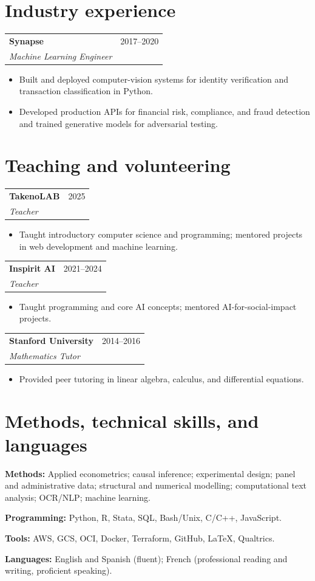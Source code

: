\documentclass[10pt,letterpaper]{article}
\makeatletter
\newcommand{\cvrole}[4]{%
  \begin{tabularx}{\textwidth}{@{}>{\raggedright\arraybackslash}X>{\raggedleft\arraybackslash}p{1.5in}@{}}
    \textbf{\color{ink}#1} & \small{#2} \\
    \textit{#3} & \hfill\makebox[0pt][r]{\textit{\small{#4}}}
  \end{tabularx}
  \vspace{0pt}
}
\newcommand{\rolebreak}{\vspace{8pt}}
\makeatother
\begin{document}
\section{Industry experience}

\cvrole{Synapse}{2017--2020}{Machine Learning Engineer}{San Francisco, CA, USA}
\begin{itemize}
  \item Built and deployed computer-vision systems for identity verification and transaction classification in Python.
  \item Developed production APIs for financial risk, compliance, and fraud detection and trained generative models for adversarial testing.
\end{itemize}

\section{Teaching and volunteering}

\cvrole{TakenoLAB}{2025}{Teacher}{Dzaleka, Malawi}
\begin{itemize}
  \item Taught introductory computer science and programming; mentored projects in web development and machine learning.
\end{itemize}
\rolebreak

\cvrole{Inspirit AI}{2021--2024}{Teacher}{Global}
\begin{itemize}
  \item Taught programming and core AI concepts; mentored AI-for-social-impact projects.
\end{itemize}
\rolebreak

\cvrole{Stanford University}{2014--2016}{Mathematics Tutor}{Stanford, CA, USA}
\begin{itemize}
  \item Provided peer tutoring in linear algebra, calculus, and differential equations.
\end{itemize}

\section{Methods, technical skills, and languages}

\textbf{Methods:} Applied econometrics; causal inference; experimental design; panel and administrative data; structural and numerical modelling; computational text analysis; OCR/NLP; machine learning.\par
\vspace{4pt}
\textbf{Programming:} Python, R, Stata, SQL, Bash/Unix, C/C++, JavaScript.\par
\vspace{4pt}
\textbf{Tools:} AWS, GCS, OCI, Docker, Terraform, GitHub, \LaTeX, Qualtrics.\par
\vspace{4pt}
\textbf{Languages:} English and Spanish (fluent); French (professional reading and writing, proficient speaking).
\end{document}
